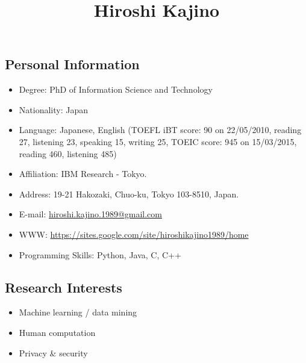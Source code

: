 \documentclass[a4paper,9pt]{article}
\title{Hiroshi Kajino}
\date{}
\begin{document}
\maketitle
\vspace{-2cm}
\subsection*{Personal Information}
\begin{itemize}
 \item Degree: PhD of Information Science and Technology
 \item Nationality: Japan
 \item Language: Japanese, English (TOEFL iBT score: 90 on 22/05/2010, reading 27, listening 23, speaking 15, writing 25, TOEIC score: 945 on 15/03/2015, reading 460, listening 485)
 \item Affiliation: IBM Research - Tokyo.
 \item Address: 19-21 Hakozaki, Chuo-ku, Tokyo 103-8510, Japan.
 \item E-mail: \url{hiroshi.kajino.1989@gmail.com}
 \item WWW: \url{https://sites.google.com/site/hiroshikajino1989/home}
 \item Programming Skills: Python, Java, C, C++
\end{itemize}
\subsection*{Research Interests}
\begin{itemize}
 \item Machine learning / data mining
 \item Human computation
 \item Privacy \& security
\end{itemize}
\end{document}
